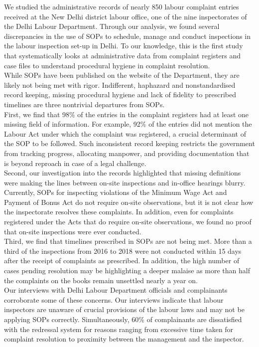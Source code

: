 \documentclass[a4paper, 12pt, twoside]{article}
\begin{document}
We studied the administrative records of nearly 850 labour complaint entries received at the New Delhi district labour office, one of the nine inspectorates of the Delhi Labour Department. Through our analysis, we found several discrepancies in the use of SOPs to schedule, manage and conduct inspections in the labour inspection set-up in Delhi. To our knowledge, this is the first study that systematically looks at administrative data from complaint registers and case files to understand procedural hygiene in complaint resolution. \\

While SOPs have been published on the website of the Department, they are likely not being met with rigor. Indifferent, haphazard and nonstandardised record keeping, missing procedural hygiene and lack of fidelity to prescribed timelines are three nontrivial departures from SOPs. \\

First, we find that 98\% of the entries in the complaint registers had at least one missing field of information. For example, 92\% of the entries did not mention the Labour Act under which the complaint was registered, a crucial determinant of the SOP to be followed. Such inconsistent record keeping restricts the government from tracking progress, allocating manpower, and providing documentation that is beyond reproach in case of a legal challenge. \\

Second, our investigation into the records highlighted that missing definitions were making the lines between on-site inspections and in-office hearings blurry. Currently, SOPs for inspecting violations of the Minimum Wage Act and Payment of Bonus Act do not require on-site observations, but it is not clear how the inspectorate resolves these complaints. In addition, even for complaints registered under the Acts that do require on-site observations, we found no proof that on-site inspections were ever conducted. \\

Third, we find that timelines prescribed in SOPs are not being met. More than a third of the inspections from 2016 to 2018 were not conducted within 15 days after the receipt of complaints as prescribed. In addition, the high number of cases pending resolution may be highlighting a deeper malaise as more than half the complaints on the books remain unsettled nearly a year on. \\

Our interviews with Delhi Labour Department officials and complainants corroborate some of these concerns. Our interviews indicate that labour inspectors are unaware of crucial provisions of the labour laws and may not be applying SOPs correctly. Simultaneously, 60\% of complainants are dissatisfied with the redressal system for reasons ranging from excessive time taken for complaint resolution to proximity between the management and the inspector. \\
\end{document}
